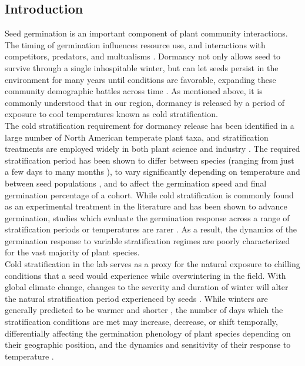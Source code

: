 \documentclass[12pt]{article}\usepackage[]{graphicx}\usepackage[]{color}
\begin{document}
\subsection*{Introduction}
\indent\indent Seed germination is an important component of plant community interactions. The timing of germination influences resource use, and interactions with competitors, predators, and multualisms \citep{Korner2008,Rathcke1985,Gioria2018}. Dormancy not only allows seed to survive through a single inhospitable winter, but can let seeds persist in the environment for many years until conditions are favorable, expanding these community demographic battles across time \citep{Long2015}. As mentioned above, it is commonly understood that in our region, dormancy is released by a period of exposure to cool temperatures known as cold stratification.\\
\indent\indent The cold stratification requirement for dormancy release has been identified in a large number of North American temperate plant taxa, and stratification treatments are employed widely in both plant science and industry \citep{Hartmann_2011}. The required stratification period has been shown to differ between species (ranging from just a few days to many months \citep{Luna2009}), to vary significantly depending on temperature and between seed populations \citep{Steadman2004}, and to affect the germination speed and final germination percentage of a cohort. While cold stratification is commonly found as an experimental treatment in the literature and has been shown to advance germination, studies which evaluate the germination response across a range of stratification periods or temperatures are rarer \citep{Batlla2009}. As a result, the dynamics of the germination response to variable stratification regimes are poorly characterized for the vast majority of plant species.\\
\indent Cold stratification in the lab serves as a proxy for the natural exposure to chilling conditions that a seed would experience while overwintering in the field. With global climate change, changes to the severity and duration of winter will alter the natural stratification period experienced by seeds \citep{Walck2011}. While winters are generally predicted to be warmer and shorter \citep{IPCC_2014}, the number of days which the stratification conditions are met may increase, decrease, or shift temporally, differentially affecting the germination phenology of plant species depending on their geographic position, and the dynamics and sensitivity of their response to temperature \citep{Walck2011}. \\
\end{document}
